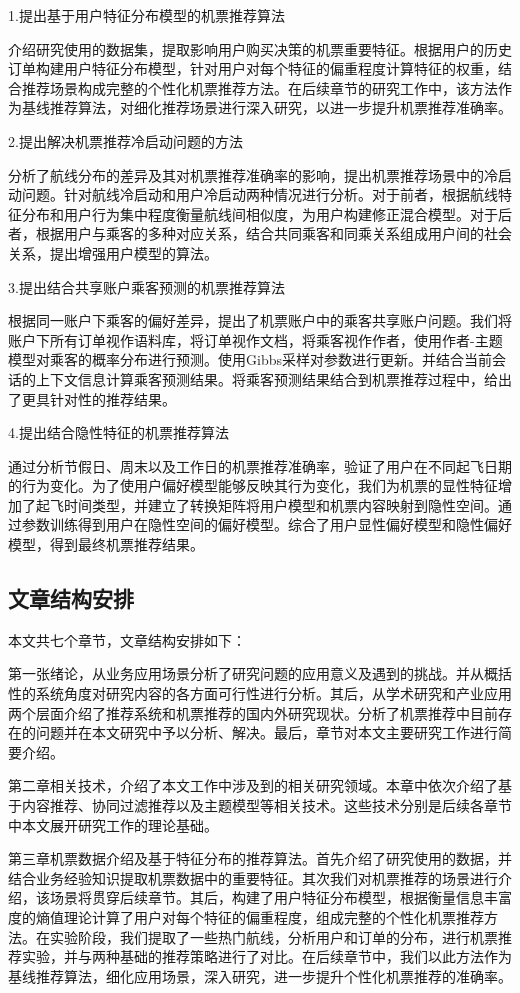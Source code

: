 1.提出基于用户特征分布模型的机票推荐算法

介绍研究使用的数据集，提取影响用户购买决策的机票重要特征。根据用户的历史订单构建用户特征分布模型，针对用户对每个特征的偏重程度计算特征的权重，结合推荐场景构成完整的个性化机票推荐方法。在后续章节的研究工作中，该方法作为基线推荐算法，对细化推荐场景进行深入研究，以进一步提升机票推荐准确率。

2.提出解决机票推荐冷启动问题的方法

分析了航线分布的差异及其对机票推荐准确率的影响，提出机票推荐场景中的冷启动问题。针对航线冷启动和用户冷启动两种情况进行分析。对于前者，根据航线特征分布和用户行为集中程度衡量航线间相似度，为用户构建修正混合模型。对于后者，根据用户与乘客的多种对应关系，结合共同乘客和同乘关系组成用户间的社会关系，提出增强用户模型的算法。


3.提出结合共享账户乘客预测的机票推荐算法

根据同一账户下乘客的偏好差异，提出了机票账户中的乘客共享账户问题。我们将账户下所有订单视作语料库，将订单视作文档，将乘客视作作者，使用作者-主题模型对乘客的概率分布进行预测。使用Gibbs采样对参数进行更新。并结合当前会话的上下文信息计算乘客预测结果。将乘客预测结果结合到机票推荐过程中，给出了更具针对性的推荐结果。

4.提出结合隐性特征的机票推荐算法

通过分析节假日、周末以及工作日的机票推荐准确率，验证了用户在不同起飞日期的行为变化。为了使用户偏好模型能够反映其行为变化，我们为机票的显性特征增加了起飞时间类型，并建立了转换矩阵将用户模型和机票内容映射到隐性空间。通过参数训练得到用户在隐性空间的偏好模型。综合了用户显性偏好模型和隐性偏好模型，得到最终机票推荐结果。


\subsection{文章结构安排}
本文共七个章节，文章结构安排如下：

第一张绪论，从业务应用场景分析了研究问题的应用意义及遇到的挑战。并从概括性的系统角度对研究内容的各方面可行性进行分析。其后，从学术研究和产业应用两个层面介绍了推荐系统和机票推荐的国内外研究现状。分析了机票推荐中目前存在的问题并在本文研究中予以分析、解决。最后，章节对本文主要研究工作进行简要介绍。

第二章相关技术，介绍了本文工作中涉及到的相关研究领域。本章中依次介绍了基于内容推荐、协同过滤推荐以及主题模型等相关技术。这些技术分别是后续各章节中本文展开研究工作的理论基础。

第三章机票数据介绍及基于特征分布的推荐算法。首先介绍了研究使用的数据，并结合业务经验知识提取机票数据中的重要特征。其次我们对机票推荐的场景进行介绍，该场景将贯穿后续章节。其后，构建了用户特征分布模型，根据衡量信息丰富度的熵值理论计算了用户对每个特征的偏重程度，组成完整的个性化机票推荐方法。在实验阶段，我们提取了一些热门航线，分析用户和订单的分布，进行机票推荐实验，并与两种基础的推荐策略进行了对比。在后续章节中，我们以此方法作为基线推荐算法，细化应用场景，深入研究，进一步提升个性化机票推荐的准确率。

